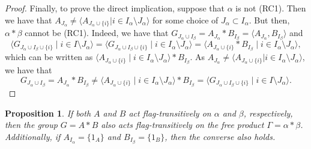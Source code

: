\documentclass[11pt,letterpaper]{amsart}
\newtheorem{prop}{Proposition}[section]
\begin{document}
\begin{proof}
    
Finally, to prove the direct implication, suppose that $\alpha$ is not (RC1). Then we have that $A_{J_\alpha} \neq \langle A_{J_\alpha \cup \{i\}} | i \in I_\alpha \setminus J_\alpha \rangle$ for some choice of $J_\alpha \subset I_\alpha$. But then, $\alpha * \beta$ cannot be (RC1).
Indeed, we have that $G_{J_\alpha \cup I_\beta} = A_{J_\alpha}*B_{I_\beta} = \langle A_{J_\alpha},B_{I_\beta}\rangle$ and $$\langle G_{J_\alpha \cup I_\beta\cup\{i\}} \mid i \in I\setminus J_\alpha\rangle = \langle G_{J_\alpha \cup I_\beta\cup\{i\}} \mid i \in I_\alpha\setminus J_\alpha\rangle = \langle A_{J_\alpha\cup\{i\}}* B_{I_\beta}\mid i \in I_\alpha\setminus J_\alpha\rangle,$$
which can be written as $\langle A_{J_\alpha\cup\{i\}}\mid i \in I_\alpha\setminus J_\alpha\rangle*B_{I_\beta}$.
As $A_{J_\alpha} \neq \langle A_{J_\alpha \cup \{i\}} | i \in I_\alpha \setminus J_\alpha \rangle$, we have that $$G_{J_\alpha \cup I_\beta}=A_{J_\alpha}*B_{I_\beta}\neq \langle A_{J_\alpha\cup\{i\}}\mid i \in I_\alpha\setminus J_\alpha\rangle*B_{I_\beta} = \langle G_{J_\alpha \cup I_\beta\cup\{i\}} \mid i \in I\setminus J_\alpha\rangle.$$
   
    
\end{proof}



\begin{prop}\label{prop:FTfree}
        If both $A$ and $B$ act flag-transitively on $\alpha$ and $\beta$, respectively, then the group $G = A * B$ also acts flag-transitively on the free product $\Gamma =\alpha * \beta$. Additionally, if $A_{I_\alpha}=\{1_A\}$ and $B_{I_\beta}=\{1_B\}$, then the converse also holds. 
        
        
\end{prop}
\end{document}
